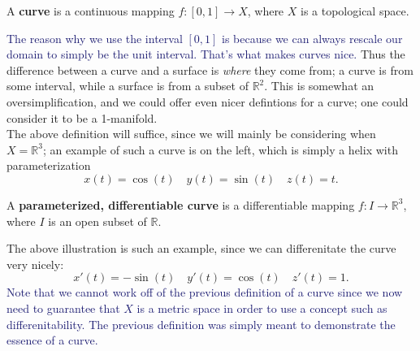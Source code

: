 \documentclass[12pt,letterpaper,boxed]{maths_v5}
\newcommand{\rr}{\mathbb{R}}
\theoremstyle{definition}
\begin{document}
\begin{defn}
    A \textbf{curve} is a continuous mapping $f:[0, 1] \to X$, 
    where $X$ is a topological space.
\end{defn}
\begin{minipage}{0.3\textwidth}
\end{minipage}
\begin{minipage}{0.6\textwidth}
    \textcolor{MidnightBlue}{The reason why we use the interval $[0, 1]$ is because 
    we can always rescale our domain to simply be the unit interval. 
    That's what makes curves nice.} Thus the difference between a 
    curve and a surface is \textit{where} they come from; a curve is from 
    some interval, while a surface is from a subset of $\rr^2$. This is somewhat an 
    oversimplification, and we could offer even nicer defintions for a curve; one could 
    consider it to be a 1-manifold. 
    \\

    The above definition will suffice, since we will mainly be considering 
    when $X = \rr^3$; an example of such a curve is on the left, which is 
    simply a helix with parameterization
    \[
        x(t) = \cos(t) \quad y(t) = \sin(t) \quad z(t) = t.
    \]
\end{minipage}
\vspace{1cm}
\begin{defn}
    A \textbf{parameterized, differentiable curve} is a differentiable 
    mapping $f: I \to \mathbb{R}^3$, where $I$ is an open subset of $\rr$. 
\end{defn}
The above illustration is such an example, since we can differenitate the curve 
very nicely: 
\[
    x'(t) = -\sin(t) \quad y'(t) = \cos(t) \quad z'(t) = 1. 
\]
\textcolor{MidnightBlue}{Note that we cannot work off of the previous definition of a 
curve since we now need to guarantee that $X$ is a metric space 
in order to use a concept such as differenitability. The previous definition 
was simply meant to demonstrate the essence of a curve.}
\end{document}
